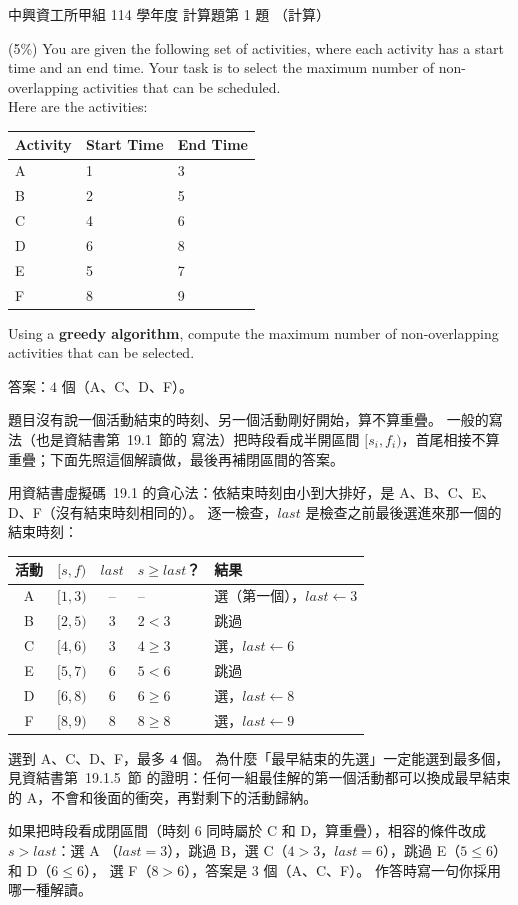 \begin{pastexam}[label={px:nchu-114-dsa-21}]{中興資工所甲組 114 學年度 計算題第 1 題}
（計算）

(5\%) You are given the following set of activities, where each activity has a start time and an end time. Your task is to select the maximum number of non-overlapping activities that can be scheduled.\\
Here are the activities:
\begin{center}
\begin{tabular}{|p{4cm}|p{4cm}|p{4cm}|}
\hline
Activity & Start Time & End Time \\ \hline
A & 1 & 3 \\ \hline
B & 2 & 5 \\ \hline
C & 4 & 6 \\ \hline
D & 6 & 8 \\ \hline
E & 5 & 7 \\ \hline
F & 8 & 9 \\ \hline
\end{tabular}
\end{center}
Using a \textbf{greedy algorithm}, compute the maximum number of non-overlapping activities that can be selected.
\end{pastexam}

\begin{pastsoln}
答案：$4$ 個（A、C、D、F）。

題目沒有說一個活動結束的時刻、另一個活動剛好開始，算不算重疊。 一般的寫法（也是資結書第~19.1~節的
寫法）把時段看成半開區間 $[s_i, f_i)$，首尾相接不算重疊；下面先照這個解讀做，最後再補閉區間的答案。

用資結書虛擬碼~19.1 的貪心法：依結束時刻由小到大排好，是 A、B、C、E、D、F（沒有結束時刻相同的）。
逐一檢查，$\mathit{last}$ 是檢查之前最後選進來那一個的結束時刻：
\begin{center}
\begin{tabular}{cccll}
\toprule
活動 & $[s, f)$ & $\mathit{last}$ & $s \ge \mathit{last}$？ & 結果 \\
\midrule
A & $[1, 3)$ & -- & -- & 選（第一個），$\mathit{last} \gets 3$ \\
B & $[2, 5)$ & 3 & $2 < 3$ & 跳過 \\
C & $[4, 6)$ & 3 & $4 \ge 3$ & 選，$\mathit{last} \gets 6$ \\
E & $[5, 7)$ & 6 & $5 < 6$ & 跳過 \\
D & $[6, 8)$ & 6 & $6 \ge 6$ & 選，$\mathit{last} \gets 8$ \\
F & $[8, 9)$ & 8 & $8 \ge 8$ & 選，$\mathit{last} \gets 9$ \\
\bottomrule
\end{tabular}
\end{center}
選到 A、C、D、F，最多 $\mathbf{4}$ 個。 為什麼「最早結束的先選」一定能選到最多個，見資結書第~19.1.5~節
的證明：任何一組最佳解的第一個活動都可以換成最早結束的 A，不會和後面的衝突，再對剩下的活動歸納。

如果把時段看成閉區間（時刻 $6$ 同時屬於 C 和 D，算重疊），相容的條件改成 $s > \mathit{last}$：選 A
（$\mathit{last} = 3$），跳過 B，選 C（$4 > 3$，$\mathit{last} = 6$），跳過 E（$5 \le 6$）和 D（$6 \le 6$），
選 F（$8 > 6$），答案是 $3$ 個（A、C、F）。 作答時寫一句你採用哪一種解讀。
\end{pastsoln}
